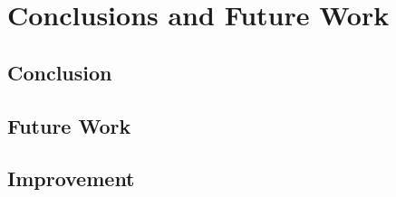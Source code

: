 \chapter{Conclusions and Future Work}\label{ch:concl}

\section{Conclusion}
\section{Future Work}
\section{Improvement}